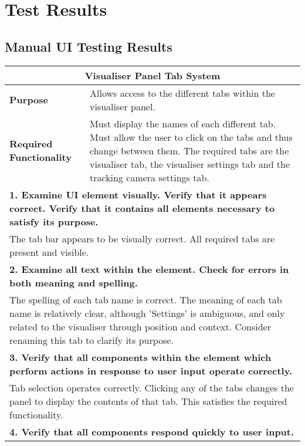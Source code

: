 
\chapter{Test Results} %

\section{Manual UI Testing Results} \label{app:UITestResults}

\begin{longtable}{ l p{10cm} }
 \hline
 \multicolumn{2}{c}{\textbf{Visualiser Panel Tab System}}\\
 \hline
 \textbf{Purpose} & Allows access to the different tabs within the visualiser panel.\\
 \textbf{Required Functionality} & Must display the names of each different tab. Must allow the user to click on the tabs and thus change between them. The required tabs are the visualiser tab, the visualiser settings tab and the tracking camera settings tab.\\
 \hline
 \multicolumn{2}{p{14cm}}{\textbf{1. Examine UI element visually. Verify that it appears correct. Verify that it contains all elements necessary to satisfy its purpose.}}\\
 \multicolumn{2}{p{14cm}}{The tab bar appears to be visually correct. All required tabs are present and visible.}\\
 \hline
 \multicolumn{2}{p{14cm}}{\textbf{2. Examine all text within the element. Check for errors in both meaning and spelling.}}\\
 \multicolumn{2}{p{14cm}}{The spelling of each tab name is correct. The meaning of each tab name is relatively clear, although 'Settings' is ambiguous, and only related to the visualiser through position and context. Consider renaming this tab to clarify its purpose.}\\
 \hline
 \multicolumn{2}{p{14cm}}{\textbf{3. Verify that all components within the element which perform actions in response to user input operate correctly.}}\\
 \multicolumn{2}{p{14cm}}{Tab selection operates correctly. Clicking any of the tabs changes the panel to display the contents of that tab. This satisfies the required functionality.}\\
 \hline
 \multicolumn{2}{p{14cm}}{\textbf{4. Verify that all components respond quickly to user input.}}\\

\end{longtable}
